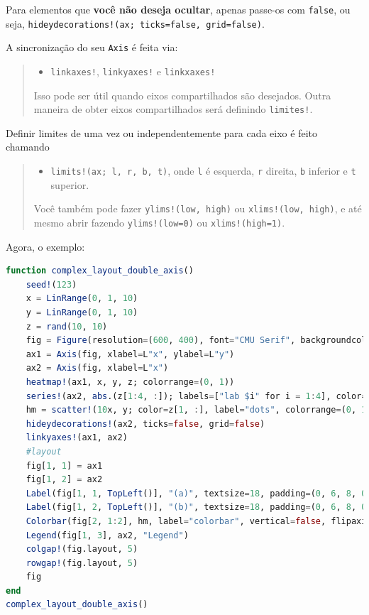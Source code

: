 \documentclass[
  notoc %
]{tufte-book}
\providecommand{\tightlist}{%
  \setlength{\itemsep}{0pt}\setlength{\parskip}{0pt}
}
\newcommand{\passthrough}[1]{#1}
\begin{document}
Para elementos que \textbf{você não deseja ocultar}, apenas passe-os com
\passthrough{\lstinline!false!}, ou seja,
\passthrough{\lstinline"hideydecorations!(ax; ticks=false, grid=false)"}.

A sincronização do seu \passthrough{\lstinline!Axis!} é feita via:

\begin{quote}
\begin{itemize}
\tightlist
\item
  \passthrough{\lstinline"linkaxes!"},
  \passthrough{\lstinline"linkyaxes!"} e
  \passthrough{\lstinline"linkxaxes!"}
\end{itemize}

Isso pode ser útil quando eixos compartilhados são desejados. Outra
maneira de obter eixos compartilhados será definindo
\passthrough{\lstinline"limites!"}.
\end{quote}

Definir limites de uma vez ou independentemente para cada eixo é feito
chamando

\begin{quote}
\begin{itemize}
\tightlist
\item
  \passthrough{\lstinline"limits!(ax; l, r, b, t)"}, onde
  \passthrough{\lstinline!l!} é esquerda, \passthrough{\lstinline!r!}
  direita, \passthrough{\lstinline!b!} inferior e
  \passthrough{\lstinline!t!} superior.
\end{itemize}

Você também pode fazer \passthrough{\lstinline"ylims!(low, high)"} ou
\passthrough{\lstinline"xlims!(low, high)"}, e até mesmo abrir fazendo
\passthrough{\lstinline"ylims!(low=0)"} ou
\passthrough{\lstinline"xlims!(high=1)"}.
\end{quote}

Agora, o exemplo:

\begin{lstlisting}[language=Julia]
function complex_layout_double_axis()
    seed!(123)
    x = LinRange(0, 1, 10)
    y = LinRange(0, 1, 10)
    z = rand(10, 10)
    fig = Figure(resolution=(600, 400), font="CMU Serif", backgroundcolor=:grey90)
    ax1 = Axis(fig, xlabel=L"x", ylabel=L"y")
    ax2 = Axis(fig, xlabel=L"x")
    heatmap!(ax1, x, y, z; colorrange=(0, 1))
    series!(ax2, abs.(z[1:4, :]); labels=["lab $i" for i = 1:4], color=:Set1_4)
    hm = scatter!(10x, y; color=z[1, :], label="dots", colorrange=(0, 1))
    hideydecorations!(ax2, ticks=false, grid=false)
    linkyaxes!(ax1, ax2)
    #layout
    fig[1, 1] = ax1
    fig[1, 2] = ax2
    Label(fig[1, 1, TopLeft()], "(a)", textsize=18, padding=(0, 6, 8, 0))
    Label(fig[1, 2, TopLeft()], "(b)", textsize=18, padding=(0, 6, 8, 0))
    Colorbar(fig[2, 1:2], hm, label="colorbar", vertical=false, flipaxis=false)
    Legend(fig[1, 3], ax2, "Legend")
    colgap!(fig.layout, 5)
    rowgap!(fig.layout, 5)
    fig
end
complex_layout_double_axis()
\end{lstlisting}
\end{document}
